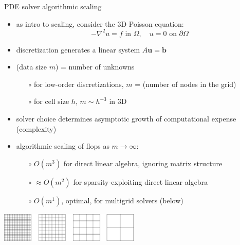 \documentclass[svgnames,
               hyperref={colorlinks,citecolor=DeepPink4,linkcolor=FireBrick,urlcolor=Maroon},
               usepdftitle=false]  %
               {beamer}
\newcommand{\grad}{\nabla}
\newcommand{\bb}{\mathbf{b}}
\newcommand{\bu}{\mathbf{u}}
\begin{document}
\begin{frame}{PDE solver algorithmic scaling}

\begin{itemize}
\item as intro to scaling, consider the 3D Poisson equation:
    $$-\grad^2 u = f \text{ in $\Omega$}, \quad u=0 \text{ on $\partial\Omega$}$$
\item discretization generates a linear system $A\bu = \bb$
\item (data size $m$) = \alert{number of unknowns}
    \begin{itemize}
    \item[$\circ$] for low-order discretizations, $m$ = (number of nodes in the grid)
    \item[$\circ$] for cell size $h$, $m \sim h^{-3}$ in 3D
    \end{itemize}
\item solver choice determines asymptotic growth of computational expense (complexity)
\item \alert{algorithmic scaling} of flops as $m\to\infty$:
    \begin{itemize}
    \item[$\circ$] $O(m^3)$ for direct linear algebra, ignoring matrix structure
    \item[$\circ$] $\approx O(m^2)$ for sparsity-exploiting direct linear algebra
    \item[$\circ$] $O(m^1)$, \alert{optimal}, for \alert{multigrid} solvers (below)
    \end{itemize}
\end{itemize}

\medskip
\begin{center}
\includegraphics[width=0.5\textwidth]{images/multigrid-grids.png}
\end{center}
\end{frame}
\end{document}
